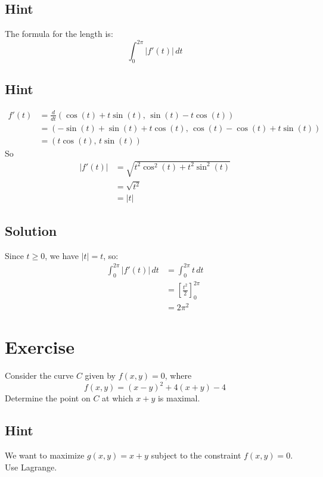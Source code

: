\documentclass[a4paper,10pt]{article}
\begin{document}
\subsection{Hint}
The formula for the length is:
\[
    \int_{0}^{2\pi} |f'(t)|\,dt
\]

\subsection{Hint}
\begin{align*}
    f'(t) & = \frac{d}{dt} (\cos(t) + t\sin(t), \, \sin(t) - t\cos(t))         \\
          & = (-\sin(t) + \sin(t) + t\cos(t), \, \cos(t) - \cos(t) + t\sin(t)) \\
          & = (t\cos(t), \, t\sin(t))
\end{align*}
So
\begin{align*}
    |f'(t)| & = \sqrt{t^2\cos^2(t) + t^2\sin^2(t)} \\
            & = \sqrt{t^2}                         \\
            & = |t|
\end{align*}

\subsection{Solution}
Since $t \geq 0$, we have $|t| = t$, so:
\begin{align*}
    \int_{0}^{2\pi} |f'(t)|\,dt & = \int_{0}^{2\pi} t \, dt                \\
                                & = \left[ \frac{t^2}{2}\right]_{0}^{2\pi} \\
                                & = 2\pi^2
\end{align*}

\clearpage

\section{Exercise}

Consider the curve $C$ given by $f(x,y) = 0$, where
\[
    f(x,y) = (x-y)^2 + 4(x+y) - 4
\]
Determine the point on $C$ at which $x+y$ is maximal.

\subsection{Hint}
We want to maximize $g(x,y) = x+y$ subject to the constraint $f(x,y)=0$. Use Lagrange.
\end{document}
